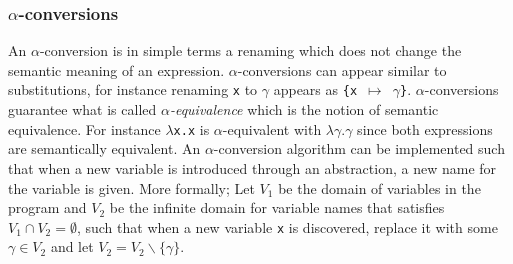 \documentclass[11pt,oneside,a4paper]{report}
\begin{document}
\subsubsection{$\alpha$-conversions} \label{sec:alpha}
An $\alpha$-conversion is in simple terms a renaming which does not change the semantic meaning of an expression.
$\alpha$-conversions can appear similar to substitutions, for instance renaming \texttt{x} to $\gamma$ appears as \texttt{\{x $\mapsto$ $\gamma$\}}.
$\alpha$-conversions guarantee what is called \textit{$\alpha$-equivalence} which is the notion of semantic equivalence.
For instance \texttt{$\lambda$x.x} is $\alpha$-equivalent with \texttt{$\lambda\gamma.\gamma$} since both expressions are semantically equivalent.
\noindent An $\alpha$-conversion algorithm can be implemented such that when a new variable is introduced through an abstraction, a new name for the variable is given.
More formally; Let $V_1$ be the domain of variables in the program and $V_2$ be the infinite domain for variable names that satisfies $V_1 \cap V_2 = \emptyset$, such that when a new variable \texttt{x} is discovered, replace it with some $\gamma \in V_2$ and let $V_2 = V_2 \backslash \{\gamma\}$. 
\end{document}
